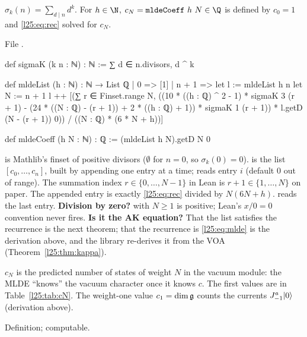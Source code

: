 \begin{definition}\label{l25:def:mlde}
$\sigma_k(n)=\sum_{d\mid n}d^k$. For $h\in\N$, $c_N=\mathtt{mldeCoeff}\ h\ N\in\Q$ is defined by $c_0=1$
and \eqref{l25:eq:rec} solved for $c_N$.
\end{definition}
\noindent File .
\begin{leancode}
def sigmaK (k n : ℕ) : ℕ := ∑ d ∈ n.divisors, d ^ k

def mldeList (h : ℕ) : ℕ → List ℚ
  | 0 => [1]
  | n + 1 =>
      let l := mldeList h n
      let N := n + 1
      l ++ [(∑ r ∈ Finset.range N,
          ((10 * ((h : ℚ) ^ 2 - 1) * sigmaK 3 (r + 1) -
            (24 * ((N : ℚ) - (r + 1)) + 2 * ((h : ℚ) + 1)) * sigmaK 1 (r + 1)) *
              l.getD (N - (r + 1)) 0)) / ((N : ℚ) * (6 * N + h))]

def mldeCoeff (h N : ℕ) : ℚ := (mldeList h N).getD N 0
\end{leancode}
\begin{dictionary}
 is Mathlib's finset of positive divisors ($\emptyset$ for $n=0$, so $\sigma_k(0)=0$).
 is the list $[c_0,\dots,c_n]$, built by appending one entry at a time;
 reads entry $i$ (default $0$ out of range). The summation index $r\in\{0,\dots,N-1\}$ in Lean is
$r+1\in\{1,\dots,N\}$ on paper. The appended entry is exactly \eqref{l25:eq:rec} divided by $N(6N+h)$.
 reads the last entry. \textbf{Division by zero?}  with
$N\ge1$ is positive; Lean's $x/0=0$ convention never fires. \textbf{Is it the AK equation?} That the list
satisfies the recurrence is the next theorem; that the recurrence is \eqref{l25:eq:mlde} is the derivation above,
and the library re-derives it from the VOA (Theorem~\ref{l25:thm:kappa}).
\end{dictionary}
\begin{physics}
$c_N$ is the predicted number of states of weight $N$ in the vacuum module: the MLDE ``knows'' the vacuum character
once it knows $c$. The first values are in Table~\ref{l25:tab:cN}. The weight-one value $c_1=\dim\mathfrak g$ counts
the currents $J^a_{-1}|0\rangle$ (derivation above).
\end{physics}
\begin{status}
Definition; computable.
\end{status}

